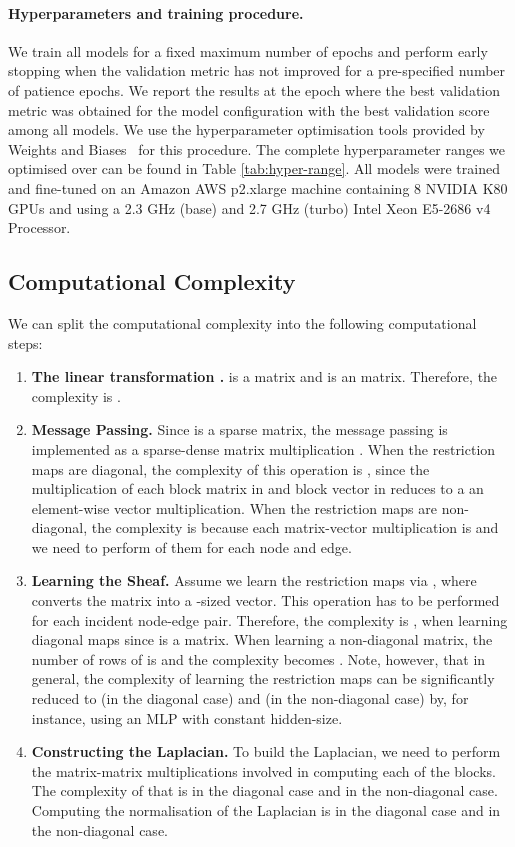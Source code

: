 \documentclass{article}
\begin{document}
\paragraph{Hyperparameters and training procedure.} We train all models for a fixed maximum number of epochs and perform early stopping when the validation metric has not improved for a pre-specified number of patience epochs. We report the results at the epoch where the best validation metric was obtained for the model configuration with the best validation score among all models. We use the hyperparameter optimisation tools provided by Weights and Biases~\citep{wandb} for this procedure. The complete hyperparameter ranges we optimised over can be found in Table \ref{tab:hyper-range}. All models were trained and fine-tuned on an Amazon AWS p2.xlarge machine containing 8 NVIDIA K80 GPUs and using a 2.3 GHz (base) and 2.7 GHz (turbo) Intel Xeon E5-2686 v4 Processor.

\subsection{Computational Complexity}\label{app:complexity}

We can split the computational complexity into the following computational steps:
\begin{enumerate}
    \item \textbf{The linear transformation . }  is a  matrix and  is an  matrix. Therefore, the complexity is . 
    \item \textbf{Message Passing. } Since  is a sparse matrix, the message passing is implemented as a sparse-dense matrix multiplication . When the restriction maps are diagonal, the complexity of this operation is , since the multiplication of each block matrix in  and block vector in  reduces to a an element-wise vector multiplication. When the restriction maps are non-diagonal, the complexity is  because each matrix-vector multiplication is  and we need to perform  of them for each node and edge. 
    \item \textbf{Learning the Sheaf. } Assume we learn the restriction maps via , where  converts the  matrix into a -sized vector. This operation has to be performed for each incident node-edge pair. Therefore, the complexity is , when learning diagonal maps since  is a  matrix. When learning a non-diagonal matrix, the number of rows of  is  and the complexity becomes . Note, however, that in general, the complexity of learning the restriction maps can be significantly reduced to  (in the diagonal case) and  (in the non-diagonal case) by, for instance, using an MLP with constant hidden-size. 
    \item \textbf{Constructing the Laplacian. } To build the Laplacian, we need to perform the matrix-matrix multiplications involved in computing each of the blocks. The complexity of that is  in the diagonal case and  in the non-diagonal case. Computing the normalisation of the Laplacian is  in the diagonal case and  in the non-diagonal case.
\end{enumerate}
\end{document}
